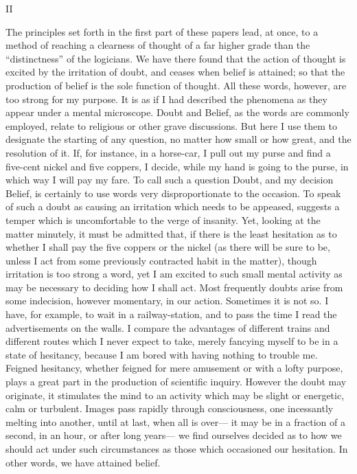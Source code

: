 \documentclass[]{article}
\newcommand{\itemsection}[1]{\bigskip\centerline{#1}\nopagebreak}
\begin{document}
\itemsection{II}

The principles set forth in the first part of these papers lead, at once, to a method of reaching a clearness of thought of a far higher grade than the ``distinctness'' of the logicians. We have there found that the action of thought is excited by the irritation of doubt, and ceases when belief is attained; so that the production of belief is the sole function of thought. All these words, however, are too strong for my purpose. It is as if I had described the phenomena as they appear under a mental microscope. Doubt and Belief, as the words are commonly employed, relate to religious or other grave discussions. But here I use them to designate the starting of any question, no matter how small or how great, and the resolution of it. If, for instance, in a horse-car, I pull out my purse and find a five-cent nickel and five coppers, I decide, while my hand is going to the purse, in which way I will pay my fare. To call such a question Doubt, and my decision Belief, is certainly to use words very disproportionate to the occasion. To speak of such a doubt as causing an irritation which needs to be appeased, suggests a temper which is uncomfortable to the verge of insanity. Yet, looking at the matter
minutely, it must be admitted that, if there is the least hesitation as to whether I shall pay the five coppers or the nickel (as there will be sure to be, unless I act  from some previously contracted habit in the matter), though irritation is too strong a word, yet I am excited to such small mental activity as may be necessary to deciding how I shall act. Most frequently doubts arise from some indecision, however momentary, in our action. Sometimes it is not so. I have, for example, to wait in a railway-station, and to pass the time I read the advertisements on the walls. I compare the advantages of different trains and different routes which I never expect to take, merely fancying myself to be in a state of hesitancy, because I am bored with having nothing to trouble me. Feigned hesitancy, whether feigned for mere amusement or with a lofty purpose, plays a great part in the production of scientific inquiry. However the doubt may originate, it stimulates the mind to an activity which may be slight or energetic, calm or turbulent. Images pass rapidly through consciousness, one incessantly melting into another, until at last, when all is over--- it may be in a fraction of a second, in an hour, or after long years--- we find ourselves decided as to how we should act under
such circumstances as those which occasioned our hesitation. In other words, we have attained belief.
 
\end{document}
